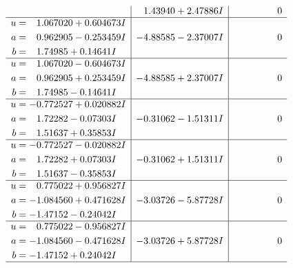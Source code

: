 \documentclass[1p]{elsarticle_modified}
\theoremstyle{definition}
\begin{document}
$$\begin{array}{c|c|c}
 & \phantom{-}1.43940 + 2.47886 I & \phantom{-0.000000 } 0 \\ \hline\begin{aligned}
u &= \phantom{-}1.067020 + 0.604673 I \\
a &= \phantom{-}0.962905 - 0.253459 I \\
b &= \phantom{-}1.74985 + 0.14641 I\end{aligned}
 & -4.88585 - 2.37007 I & \phantom{-0.000000 } 0 \\ \hline\begin{aligned}
u &= \phantom{-}1.067020 - 0.604673 I \\
a &= \phantom{-}0.962905 + 0.253459 I \\
b &= \phantom{-}1.74985 - 0.14641 I\end{aligned}
 & -4.88585 + 2.37007 I & \phantom{-0.000000 } 0 \\ \hline\begin{aligned}
u &= -0.772527 + 0.020882 I \\
a &= \phantom{-}1.72282 - 0.07303 I \\
b &= \phantom{-}1.51637 + 0.35853 I\end{aligned}
 & -0.31062 - 1.51311 I & \phantom{-0.000000 } 0 \\ \hline\begin{aligned}
u &= -0.772527 - 0.020882 I \\
a &= \phantom{-}1.72282 + 0.07303 I \\
b &= \phantom{-}1.51637 - 0.35853 I\end{aligned}
 & -0.31062 + 1.51311 I & \phantom{-0.000000 } 0 \\ \hline\begin{aligned}
u &= \phantom{-}0.775022 + 0.956827 I \\
a &= -1.084560 + 0.471628 I \\
b &= -1.47152 - 0.24042 I\end{aligned}
 & -3.03726 - 5.87728 I & \phantom{-0.000000 } 0 \\ \hline\begin{aligned}
u &= \phantom{-}0.775022 - 0.956827 I \\
a &= -1.084560 - 0.471628 I \\
b &= -1.47152 + 0.24042 I\end{aligned}
 & -3.03726 + 5.87728 I & \phantom{-0.000000 } 0\\
 \hline 
 \end{array}$$\newpage$$\begin{array}{c|c|c}  

\end{array}$$
\end{document}
